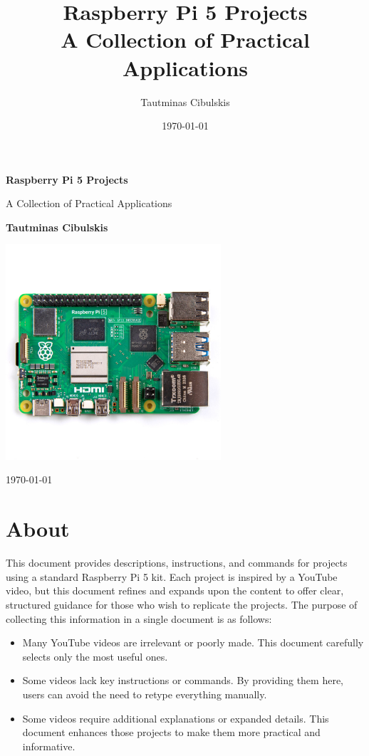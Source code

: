 \documentclass[a4paper,12pt]{article}
\title{\textbf{Raspberry Pi 5 Projects} \\ \Large A Collection of Practical Applications}
\author{Tautminas Cibulskis}
\date{\today}
\begin{document}
\begin{titlepage}
    \centering
    \vspace*{2cm}
    {\Huge \textbf{Raspberry Pi 5 Projects} \par}
    \vspace{0.5cm}
    {\Large A Collection of Practical Applications\par}
    \vspace{2cm}
    {\Large \textbf{Tautminas Cibulskis} \par}
    \vspace{1.5cm}
    \includegraphics[width=0.6\textwidth]{raspberry-pi-5.jpg}
    \vfill
    {\large \today\par}
\end{titlepage}

\renewcommand{\cftsecleader}{\cftdotfill{\cftdotsep}}

\tableofcontents

\section*{About}

This document provides descriptions, instructions, and commands for projects using a standard Raspberry Pi 5 kit. Each project is inspired by a YouTube video, but this document refines and expands upon the content to offer clear, structured guidance for those who wish to replicate the projects. The purpose of collecting this information in a single document is as follows:

\begin{itemize}
\item Many YouTube videos are irrelevant or poorly made. This document carefully selects only the most useful ones.
\item Some videos lack key instructions or commands. By providing them here, users can avoid the need to retype everything manually.
\item Some videos require additional explanations or expanded details. This document enhances those projects to make them more practical and informative.
\end{itemize}
\end{document}
